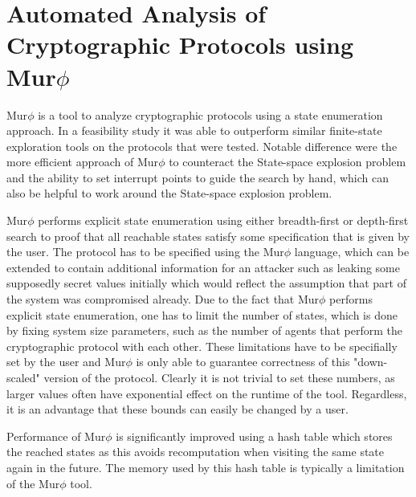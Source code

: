 \documentclass[a4paper,UKenglish]{lipics-v2018}
\def\murphi{Mur$\phi$ }
\begin{document}









\newpage
\section{Automated Analysis of Cryptographic Protocols using \murphi}

\murphi is a tool to analyze cryptographic protocols using a state enumeration approach. In a feasibility study it was able to outperform similar finite-state exploration tools on the protocols that were tested. Notable difference were the more efficient approach of \murphi to counteract the State-space explosion problem and the ability to set interrupt points to guide the search by hand, which can also be helpful to work around the State-space explosion problem.\cite{murphi}

\murphi performs explicit state enumeration using either breadth-first or depth-first search to proof that all reachable states satisfy some specification that is given by the user. The protocol has to be specified using the \murphi language, which can be extended to contain additional information for an attacker such as leaking some supposedly secret values initially which would reflect the assumption that part of the system was compromised already. Due to the fact that \murphi performs explicit state enumeration, one has to limit the number of states, which is done by fixing system size parameters, such as the number of agents that perform the cryptographic protocol with each other. These limitations have to be specifially set by the user and \murphi is only able to guarantee correctness of this "down-scaled" version of the protocol. Clearly it is not trivial to set these numbers, as larger values often have exponential effect on the runtime of the tool.\cite{murphi} Regardless, it is an advantage that these bounds can easily be changed by a user.

Performance of \murphi is significantly improved using a hash table which stores the reached states as this avoids recomputation when visiting the same state again in the future. The memory used by this hash table is typically a limitation of the \murphi tool.\cite{murphi}
\end{document}
